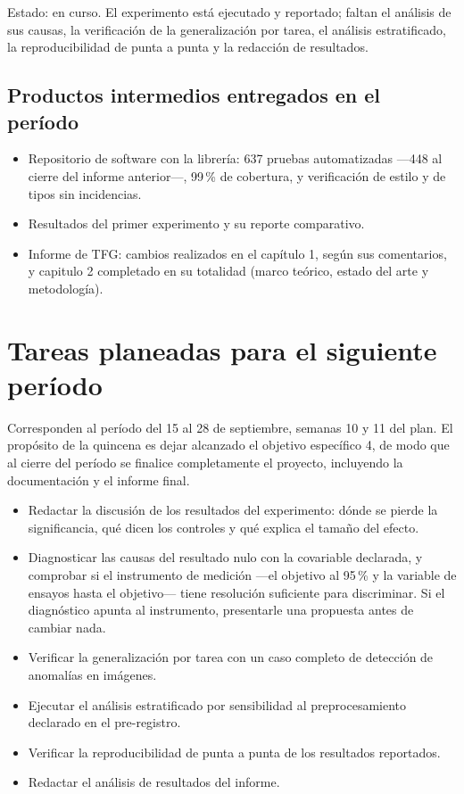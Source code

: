 \documentclass[11pt,letterpaper]{article}
\begin{document}
Estado: en curso. El experimento está ejecutado y reportado; faltan el análisis de sus
causas, la verificación de la generalización por tarea, el análisis estratificado, la
reproducibilidad de punta a punta y la redacción de resultados.

\subsection{Productos intermedios entregados en el período}

\begin{itemize}
  \item Repositorio de software con la librería: 637 pruebas automatizadas ---448 al
        cierre del informe anterior---, 99\,\% de cobertura, y verificación de estilo y
        de tipos sin incidencias.
  \item Resultados del primer experimento y su reporte comparativo.
  \item Informe de TFG: cambios realizados en el capítulo 1, según sus comentarios, y capitulo 2 completado en su totalidad (marco teórico, estado del arte y metodología).
\end{itemize}

\newpage
\section{Tareas planeadas para el siguiente período}

Corresponden al período del 15 al 28 de septiembre, semanas 10 y 11 del plan. El
propósito de la quincena es dejar alcanzado el objetivo específico 4, de modo que al
cierre del período se finalice completamente el proyecto, incluyendo la documentación y el informe final.

\begin{itemize}
  \item Redactar la discusión de los resultados del experimento: dónde se pierde la
        significancia, qué dicen los controles y qué explica el tamaño del efecto.
  \item Diagnosticar las causas del resultado nulo con la covariable declarada, y
        comprobar si el instrumento de medición ---el objetivo al 95\,\% y la variable de
        ensayos hasta el objetivo--- tiene resolución suficiente para discriminar. Si el
        diagnóstico apunta al instrumento, presentarle una propuesta antes de cambiar
        nada.
  \item Verificar la generalización por tarea con un caso completo de detección de
        anomalías en imágenes.
  \item Ejecutar el análisis estratificado por sensibilidad al preprocesamiento declarado
        en el pre-registro.
  \item Verificar la reproducibilidad de punta a punta de los resultados reportados.
  \item Redactar el análisis de resultados del informe.
\end{itemize}
\end{document}
